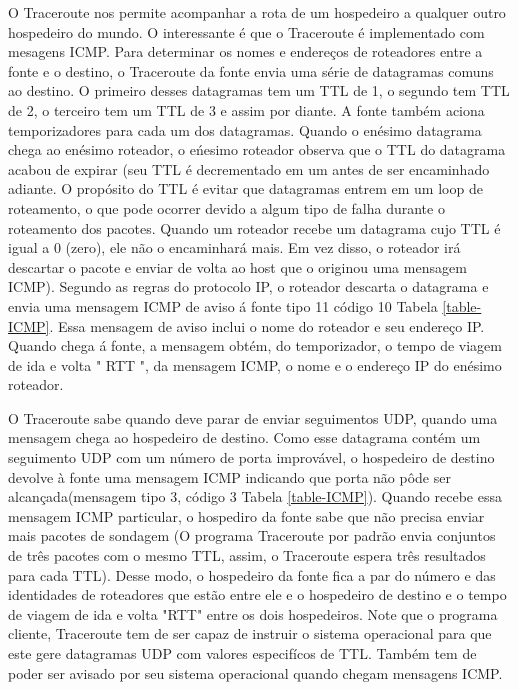 \documentclass[
	article,			%
	11pt,				%
	oneside,			%
	a4paper,			%
	english,			%
	brazil,				%
	sumario=tradicional
	]{abntex2}
\begin{document}
O Traceroute nos permite acompanhar a rota de um hospedeiro a qualquer outro hospedeiro do mundo. O interessante é que o Traceroute é implementado com mesagens ICMP. Para determinar os nomes e endereços de roteadores entre a fonte e o destino, o Traceroute da fonte envia uma série de datagramas comuns ao destino. O primeiro desses datagramas tem um TTL de 1, o segundo tem TTL de 2, o terceiro tem um TTL de 3 e assim por diante. A fonte também aciona temporizadores para cada um dos datagramas. Quando o enésimo datagrama chega ao enésimo roteador, o eńesimo roteador observa que o TTL do datagrama acabou de expirar (seu TTL é decrementado em um antes de ser encaminhado adiante. O propósito do TTL é evitar que datagramas entrem em um loop de roteamento, o que pode ocorrer devido a algum tipo de falha durante o roteamento dos pacotes. Quando um roteador recebe um datagrama cujo TTL é igual a 0 (zero), ele não o encaminhará mais. Em vez disso, o roteador irá descartar o pacote e enviar de volta ao host que o originou uma mensagem ICMP). Segundo as regras do protocolo IP, o roteador descarta o datagrama e envia uma mensagem ICMP de aviso á fonte tipo 11 código 10 Tabela \ref{table-ICMP}. Essa mensagem de aviso inclui o nome do roteador e seu endereço IP. Quando chega á fonte, a mensagem obtém, do temporizador, o tempo de viagem de ida e volta " RTT ", da mensagem ICMP, o nome e o endereço IP do enésimo roteador.\cite{Kurose}
 
O Traceroute sabe quando deve parar de enviar seguimentos UDP, quando uma mensagem chega ao hospedeiro de destino. Como esse datagrama contém um seguimento UDP com um número de porta improvável, o hospedeiro de destino devolve à fonte uma mensagem ICMP indicando que porta não pôde ser alcançada(mensagem tipo 3, código 3 Tabela \ref{table-ICMP}). Quando recebe essa mensagem ICMP particular, o hospediro da fonte sabe que não precisa enviar mais pacotes de sondagem (O programa Traceroute por padrão envia conjuntos de três pacotes com o mesmo TTL, assim, o Traceroute espera três resultados para cada TTL). Desse modo, o hospedeiro da fonte fica a par do número e das identidades de roteadores que estão entre ele e o hospedeiro de destino e o tempo de viagem de ida e volta "RTT" entre os dois hospedeiros. Note que o programa cliente, Traceroute tem de ser capaz de instruir o sistema operacional para que este gere datagramas UDP com valores especifícos de TTL. Também tem de poder ser avisado por seu sistema operacional quando chegam mensagens ICMP.
\end{document}
